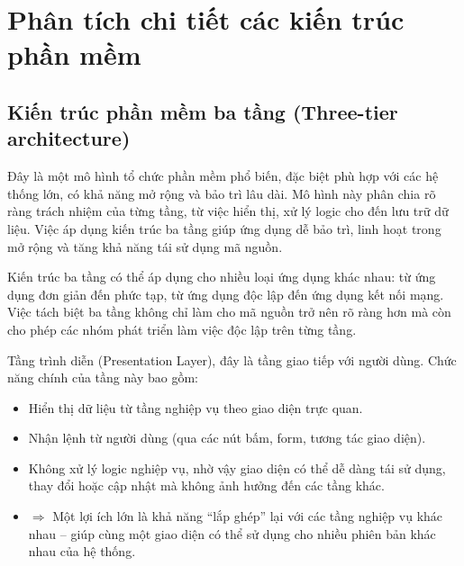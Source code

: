 \section{Phân tích chi tiết các kiến trúc phần mềm}

% 
\subsection{Kiến trúc phần mềm ba tầng (Three-tier architecture)}
\renewcommand{\labelitemi}{--}    
    \begin{flushleft}
        \hspace*{0.8cm}Đây là một mô hình tổ chức phần mềm phổ biến, đặc biệt phù hợp với các hệ thống lớn, có khả năng mở rộng và bảo trì lâu dài. Mô hình này phân chia rõ ràng trách nhiệm của từng tầng, từ việc hiển thị, xử lý logic cho đến lưu trữ dữ liệu. Việc áp dụng kiến trúc ba tầng giúp ứng dụng dễ bảo trì, linh hoạt trong mở rộng và tăng khả năng tái sử dụng mã nguồn.
    \end{flushleft}

    \begin{flushleft}
      \hspace*{0.8cm}Kiến trúc ba tầng có thể áp dụng cho nhiều loại ứng dụng khác nhau: từ ứng dụng đơn giản đến phức tạp, từ ứng dụng độc lập đến ứng dụng kết nối mạng. Việc tách biệt ba tầng không chỉ làm cho mã nguồn trở nên rõ ràng hơn mà còn cho phép các nhóm phát triển làm việc độc lập trên từng tầng.
    \end{flushleft}

    \begin{flushleft}
      \hspace*{0.8cm}Tầng trình diễn (Presentation Layer), đây là tầng giao tiếp với người dùng. Chức năng chính của tầng này bao gồm:
      \setlength{\leftmargini}{1.5cm}
      \begin{itemize}
          \item Hiển thị dữ liệu từ tầng nghiệp vụ theo giao diện trực quan.
          \item Nhận lệnh từ người dùng (qua các nút bấm, form, tương tác giao diện).
          \item Không xử lý logic nghiệp vụ, nhờ vậy giao diện có thể dễ dàng tái sử dụng, thay đổi hoặc cập nhật mà không ảnh hưởng đến các tầng khác.
          \item[]$\Rightarrow$ Một lợi ích lớn là khả năng “lắp ghép” lại với các tầng nghiệp vụ khác nhau – giúp cùng một giao diện có thể sử dụng cho nhiều phiên bản khác nhau của hệ thống.
      \end{itemize}
    \end{flushleft}

